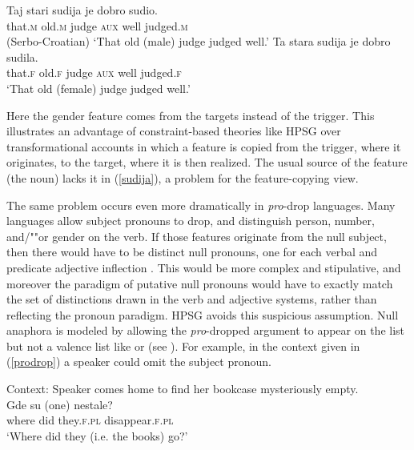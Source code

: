 \documentclass[output=paper
 	        ,biblatex
                ,babelshorthands
                ,newtxmath
                ,draftmode
                ,colorlinks, citecolor=brown
]{langscibook}
\begin{document}
\begin{exe}
\ex \label{sudija}
\begin{xlist}
\ex
\gll Taj	stari	sudija	je	dobro	sudio.	 \\
     that.\textsc{m}	old.\textsc{m}	judge	\textsc{aux}	well	judged.\textsc{m} \\\hfill(Serbo-Croatian)
\glt `That old (male) judge judged well.'
\ex 
\label{ex-ta-stara-studija}
 \gll Ta	      stara	     sudija	je	dobro	sudila. \\
      that.\textsc{f} old.\textsc{f} judge	\textsc{aux}	well	judged.\textsc{f}\\
	\glt `That old (female) judge  judged well.’
\end{xlist}
\end{exe}

\noindent 
Here the gender feature comes from the targets instead of the trigger.   This illustrates an advantage of constraint-based theories like HPSG over transformational accounts in which a feature is copied from the trigger, where it originates, to the target, where it is then realized.  The usual source of the feature (the noun) lacks it in (\ref{sudija}), a problem for the feature-copying view.

The same problem occurs even more dramatically in \emph{pro}-drop languages.  Many languages
allow subject pronouns to drop, and distinguish person, number, and/""or gender on the verb.  If those
features originate from the null subject, then there would have to be distinct null pronouns, one
for each verbal and predicate adjective inflection \citep[64]{Pollard+Sag:1994}.  This would be more
complex and stipulative, and moreover the paradigm of putative null pronouns would have to exactly
match the set of distinctions drawn in the verb and adjective systems, rather than reflecting the
pronoun paradigm. HPSG avoids this suspicious assumption.  Null anaphora is modeled by allowing
the \textit{pro}-dropped argument to appear on the \argst list but not a valence list like \subj or \comps (see ).  For example, in the context given in (\ref{prodrop}) a  speaker could omit the subject pronoun.  

\begin{exe}
\ex 
\label{prodrop}
Context: Speaker comes home to find her bookcase mysteriously empty. \\
\gll Gde   su  (one)                           nestale? \\
     where did \hphantom{(}they.\textsc{f.pl} disappear.\textsc{f.pl}     \\
\glt `Where did they (i.e. the books) go?' 
\end{exe}
\end{document}
